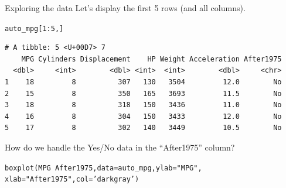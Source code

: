 \documentclass{beamer}\usepackage[]{graphicx}\usepackage[]{color}
\makeatletter
\newcommand{\hlnum}[1]{\textcolor[rgb]{0.824,0.412,0.118}{#1}}%
\newcommand{\hlstr}[1]{\textcolor[rgb]{1,0.894,0.71}{#1}}%
\newcommand{\hlopt}[1]{\textcolor[rgb]{1,0.894,0.769}{#1}}%
\newcommand{\hlstd}[1]{\textcolor[rgb]{1,0.894,0.769}{#1}}%
\newcommand{\hlkwc}[1]{\textcolor[rgb]{0.78,0.941,0.545}{#1}}%
\newcommand{\hlkwd}[1]{\textcolor[rgb]{1,0.78,0.769}{#1}}%
\newenvironment{kframe}{%
 \def\at@end@of@kframe{}%
 \ifinner\ifhmode%
  \def\at@end@of@kframe{\end{minipage}}%
  \begin{minipage}{\columnwidth}%
 \fi\fi%
 \def\FrameCommand##1{\hskip\@totalleftmargin \hskip-\fboxsep
 \colorbox{shadecolor}{##1}\hskip-\fboxsep
     \hskip-\linewidth \hskip-\@totalleftmargin \hskip\columnwidth}%
 \MakeFramed {\advance\hsize-\width
   \@totalleftmargin\z@ \linewidth\hsize
   \@setminipage}}%
 {\par\unskip\endMakeFramed%
 \at@end@of@kframe}
\newenvironment{knitrout}{}{} %
\makeatother
\begin{document}
\begin{darkframes}
    
    \begin{frame}[fragile]{Exploring the data}
      \fontsize{9}{9}\selectfont
      Let's display the first 5 rows (and all columns).
\begin{knitrout}
\begin{kframe}
\begin{alltt}
\hlstd{auto_mpg[}\hlnum{1}\hlopt{:}\hlnum{5}\hlstd{,]}
\end{alltt}
\begin{verbatim}
# A tibble: 5 <U+00D7> 7
    MPG Cylinders Displacement    HP Weight Acceleration After1975
  <dbl>     <int>        <dbl> <int>  <int>        <dbl>     <chr>
1    18         8          307   130   3504         12.0        No
2    15         8          350   165   3693         11.5        No
3    18         8          318   150   3436         11.0        No
4    16         8          304   150   3433         12.0        No
5    17         8          302   140   3449         10.5        No
\end{verbatim}
\end{kframe}
\end{knitrout}
      \pause
      How do we handle the Yes/No data in the ``After1975'' column?
    \end{frame}
    
    
    
    
    \begin{frame}[fragile]%
\begin{knitrout}
\begin{kframe}
\begin{alltt}
\hlkwd{boxplot}\hlstd{(MPG} \hlopt{~} \hlstd{After1975,} \hlkwc{data}\hlstd{=auto_mpg,} \hlkwc{ylab}\hlstd{=}\hlstr{"MPG"}\hlstd{,}
              \hlkwc{xlab}\hlstd{=}\hlstr{"After 1975"}\hlstd{,} \hlkwc{col}\hlstd{=}\hlstr{'darkgray'}\hlstd{)}
\end{alltt}
\end{kframe}


\end{knitrout}
      
    \end{frame}
    
    
    

\end{darkframes}
\end{document}

